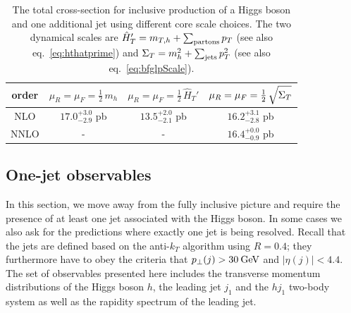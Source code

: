 \begin{table}
  \centering
  \begin{tabular}{c||c|c|c}
    order \vphantom{$\int\limits_a^b$} & $\mu_R=\mu_F=\tfrac{1}{2}\,m_h$ & $\mu_R=\mu_F=\tfrac{1}{2}\,\hat{H}_T'$ & $\mu_R=\mu_F=\tfrac{1}{2}\,\sqrt{\vphantom{\big[}\Sigma_T}$ \\
    \hline\hline
    NLO \vphantom{$\int\limits_a^b$}  & $17.0^{+3.0}_{-2.9}$ pb & $13.5^{+2.0}_{-2.1}$ pb & $16.2^{+3.1}_{-2.8}$ pb \\\hline
    NNLO \vphantom{$\int\limits_a^b$} & -     & -     & $16.4^{+0.0}_{-0.9}$ pb \\
    \hline
  \end{tabular}
  \caption{
    The total cross-section for inclusive production of a Higgs boson and 
    one additional jet using different core scale choices.  The two 
    dynamical scales are $\hat{H}_T'=m_{T,h} + \sum_{\rm partons} p_T$ 
    (see also eq.~\eqref{eq:hthatprime}) and 
    $\Sigma_T = m_h^2 + \sum_{\rm jets} p_T^2$ 
    (see also eq.~\eqref{eq:bfglpScale}).
  }
  \label{tab:H1jXS}
\end{table}


\subsection{One-jet observables}
\label{sec:hjetscomp:results:1jobs}

In this section, we move away from the fully inclusive picture and
require the presence of at least one jet associated with the Higgs
boson. In some cases we also ask for the predictions where exactly one
jet is being resolved. Recall that the jets are defined based on the
anti-$k_T$ algorithm using $R=0.4$; they furthermore have to obey the
criteria that $p_\perp(j)>30\text{\:GeV}$ and $|\eta(j)|<4.4$. The set of
observables presented here includes the transverse momentum
distributions of the Higgs boson $h$, the leading jet $j_1$ and the
$hj_1$ two-body system as well as the rapidity spectrum of the leading
jet.

